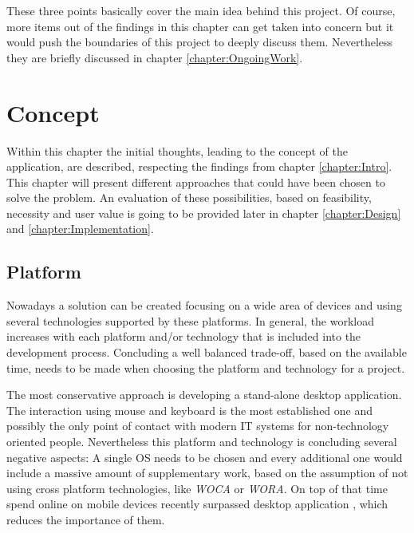 These three points basically cover the main idea behind this project. Of course, more items out of the findings in this chapter can get taken into concern but it would push the boundaries of this project to deeply discuss them. Nevertheless they are briefly discussed in chapter \vref{chapter:OngoingWork}.

\chapter{Concept}
\label{chapter:Concept}
Within this chapter the initial thoughts, leading to the concept of the application, are described, respecting the findings from chapter \ref{chapter:Intro}. This chapter will present different approaches that could have been chosen to solve the problem. An evaluation of these possibilities, based on feasibility, necessity and user value is going to be provided later in chapter \vref{chapter:Design} and \vref{chapter:Implementation}.

\section{Platform}
\label{sec:Platform}

Nowadays a solution can be created focusing on a wide area of devices and using several technologies supported by these platforms. In general, the workload increases with each platform and/or technology that is included into the development process. Concluding a well balanced trade-off, based on the available time, needs to be made when choosing the platform and technology for a project.

The most conservative approach is developing a stand-alone desktop application. The interaction using mouse and keyboard is the most established one and possibly the only point of contact with modern \gls{IT} systems for non-technology oriented people. Nevertheless this platform and technology is concluding several negative aspects: A single \gls{OS} needs to be chosen and every additional one would include a massive amount of supplementary work, based on the assumption of not using cross platform technologies, like \emph{\Acrfull{WOCA}} or \emph{\Acrfull{WORA}}. On top of that time spend online on mobile devices recently surpassed desktop application \cite{Murtagh:2014aa}, which reduces the importance of them. 

